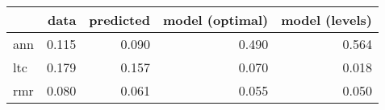 \begin{tabular}{lrrrr}
\toprule
{} &   data &  predicted &  model (optimal) &  model (levels) \\
\midrule
ann &  0.115 &      0.090 &            0.490 &           0.564 \\
ltc &  0.179 &      0.157 &            0.070 &           0.018 \\
rmr &  0.080 &      0.061 &            0.055 &           0.050 \\
\bottomrule
\end{tabular}
